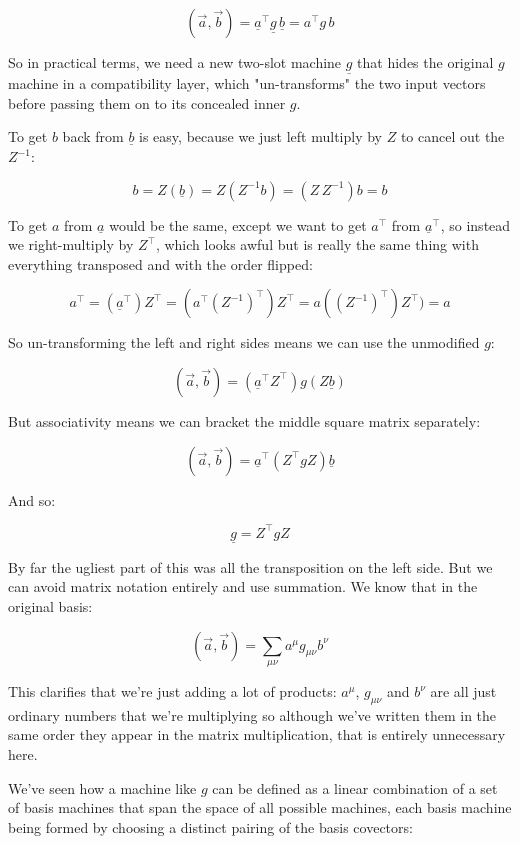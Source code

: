 $$
(\vec{a}, \vec{b}) = \underline{a}^\intercal \underline{g}\, \underline{b} = a^\intercal g\, b
$$

So in practical terms, we need a new two-slot machine $\underline{g}$ that hides the original $g$ machine in a compatibility layer, which "un-transforms" the two input vectors before passing them on to its concealed inner $g$.

To get $b$ back from $\underline{b}$ is easy, because we just left multiply by $Z$ to cancel out the $Z^{-1}$:

$$
b = Z(\underline{b}) = Z(Z^{-1}b) = (Z\,Z^{-1})b = b
$$

To get $a$ from $\underline{a}$ would be the same, except we want to get $a^\intercal$ from $\underline{a}^\intercal$, so instead we right-multiply by $Z^\intercal$, which looks awful but is really the same thing with everything transposed and with the order flipped:

$$
a^\intercal = (\underline{a}^\intercal)Z^\intercal = (a^\intercal (Z^{-1})^\intercal) Z^\intercal = a((Z^{-1})^\intercal) Z^\intercal) = a
$$

So un-transforming the left and right sides means we can use the unmodified $g$:

$$
(\vec{a}, \vec{b}) = (\underline{a}^\intercal Z^\intercal) g (Z \underline{b}) 
$$

But associativity means we can bracket the middle square matrix separately:

$$
(\vec{a}, \vec{b}) = \underline{a}^\intercal (Z^\intercal g Z) \underline{b} 
$$

And so:

$$
\underline{g} = Z^\intercal g Z
$$

By far the ugliest part of this was all the transposition on the left side. But we can avoid matrix notation entirely and use summation. We know that in the original basis:

$$
(\vec{a}, \vec{b}) = \sum_{\mu\nu} a^{\mu} g_{\mu\nu} b^{\nu}
$$

This clarifies that we're just adding a lot of products: $a^{\mu}$, $g_{\mu\nu}$ and $b^{\nu}$ are all just ordinary numbers that we're multiplying so although we've written them in the same order they appear in the matrix multiplication, that is entirely unnecessary here.

We've seen how a machine like $g$ can be defined as a linear combination of a set of basis machines that span the space of all possible machines, each basis machine being formed by choosing a distinct pairing of the basis covectors:

